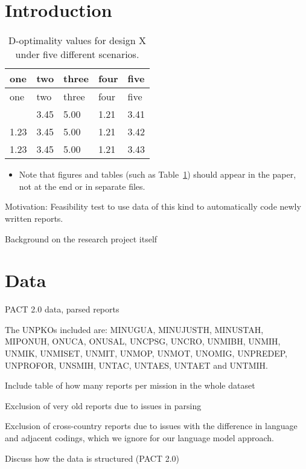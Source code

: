 \documentclass[
  12pt]{article}
\providecommand{\tightlist}{%
  \setlength{\itemsep}{0pt}\setlength{\parskip}{0pt}}\usepackage{longtable,booktabs,array}
\begin{document}
\section{Introduction}\label{sec-intro}

\begin{longtable}[]{@{}lllll@{}}
\caption{D-optimality values for design X under five different
scenarios.}\label{tbl-one}\tabularnewline
\toprule\noalign{}
one & two & three & four & five \\
\midrule\noalign{}
\endfirsthead
\toprule\noalign{}
one & two & three & four & five \\
\midrule\noalign{}
\endhead
\bottomrule\noalign{}
\endlastfoot
1.23 & 3.45 & 5.00 & 1.21 & 3.41 \\
1.23 & 3.45 & 5.00 & 1.21 & 3.42 \\
1.23 & 3.45 & 5.00 & 1.21 & 3.43 \\
\end{longtable}

\begin{itemize}
\tightlist
\item
  Note that figures and tables (such as Table~\ref{tbl-one}) should
  appear in the paper, not at the end or in separate files.
\end{itemize}

Motivation: Feasibility test to use data of this kind to automatically
code newly written reports.

Background on the research project itself

\section{Data}\label{sec-data}

PACT 2.0 data, parsed reports

The UNPKOs included are: MINUGUA, MINUJUSTH, MINUSTAH, MIPONUH, ONUCA,
ONUSAL, UNCPSG, UNCRO, UNMIBH, UNMIH, UNMIK, UNMISET, UNMIT, UNMOP,
UNMOT, UNOMIG, UNPREDEP, UNPROFOR, UNSMIH, UNTAC, UNTAES, UNTAET and
UNTMIH.

Include table of how many reports per mission in the whole dataset

Exclusion of very old reports due to issues in parsing

Exclusion of cross-country reports due to issues with the difference in
language and adjacent codings, which we ignore for our language model
approach.

Discuss how the data is structured (PACT 2.0)
\end{document}
